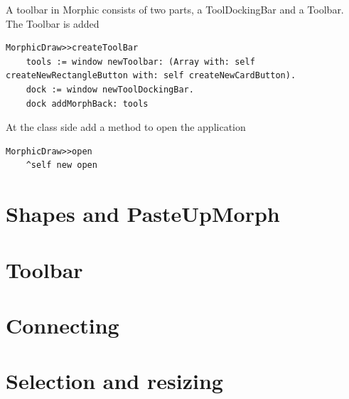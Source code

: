 \documentclass[10pt]{article}   	%
\begin{document}
A toolbar in Morphic consists of two parts, a ToolDockingBar and
a Toolbar. The Toolbar is added 

\begin{verbatim}
MorphicDraw>>createToolBar
    tools := window newToolbar: (Array with: self createNewRectangleButton with: self createNewCardButton).
    dock := window newToolDockingBar.
    dock addMorphBack: tools
\end{verbatim}

At the class side add a method to open the application

\begin{verbatim}
MorphicDraw>>open
    ^self new open
\end{verbatim}

\section{Shapes and PasteUpMorph}

\section{Toolbar}
\section{Connecting}



\section{Selection and resizing}
\end{document}
